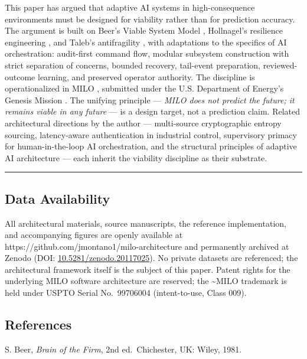 This paper has argued that adaptive AI systems in high-consequence
environments must be designed for viability rather than for prediction
accuracy. The argument is built on Beer's Viable System Model \cite{ref1},
Hollnagel's resilience engineering \cite{ref2}, and Taleb's antifragility
\cite{ref3}, with adaptations to the specifics of AI orchestration:
audit-first command flow, modular subsystem construction with strict
separation of concerns, bounded recovery, tail-event preparation,
reviewed-outcome learning, and preserved operator authority. The
discipline is operationalized in MILO \cite{ref4}, submitted under the U.S.
Department of Energy's Genesis Mission \cite{ref5}. The unifying principle
--- \emph{MILO does not predict the future; it remains viable in any
future} --- is a design target, not a prediction claim. Related
architectural directions by the author --- multi-source cryptographic
entropy sourcing, latency-aware authentication in industrial control,
supervisory primacy for human-in-the-loop AI orchestration, and the
structural principles of adaptive AI architecture --- each inherit the
viability discipline as their substrate.

\begin{center}\rule{0.5\linewidth}{0.5pt}\end{center}

\subsection{Data Availability}\label{data-availability}

All architectural materials, source manuscripts, the reference
implementation, and accompanying figures are openly available at
https://github.com/jmontano1/milo-architecture and permanently archived
at Zenodo (DOI:
\href{https://doi.org/10.5281/zenodo.20117025}{10.5281/zenodo.20117025}).
No private datasets are referenced; the architectural framework itself
is the subject of this paper. Patent rights for the underlying MILO
software architecture are reserved; the \textasciitilde MILO trademark
is held under USPTO Serial No.~99706004 (intent-to-use, Class 009).

\subsection{References}\label{references}

\cite{ref1} S. Beer, \emph{Brain of the Firm}, 2nd ed.~Chichester, UK:
Wiley, 1981.

